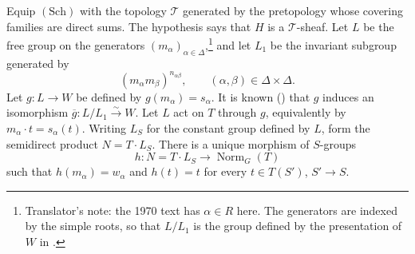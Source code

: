 

\SGAProof
Equip \((\mathrm{Sch})\) with the topology \(\mathcal T\) generated
by the pretopology whose covering families are direct sums. The
hypothesis says that \(H\) is a \(\mathcal T\)-sheaf. Let \(L\) be
the free group on the generators \((m_\alpha)_{\alpha\in\Delta}\),\footnote{Translator's note: the 1970 text has
\(\alpha\in R\) here. The generators are indexed by the simple roots, so that
\(L/L_1\) is the group defined by the presentation of \(W\) in
.} and
let \(L_1\) be the invariant subgroup generated by
\[
  (m_\alpha m_\beta)^{n_{\alpha\beta}},
  \qquad(\alpha,\beta)\in\Delta\times\Delta.
\]
Let \(g:L\to W\) be defined by \(g(m_\alpha)=s_\alpha\). It is known
() that \(g\) induces an isomorphism
\(\overline g:L/L_1\xrightarrow{\sim}W\). Let \(L\) act on \(T\)
through \(g\), equivalently by \(m_\alpha\cdot t=s_\alpha(t)\).
Writing \(L_S\) for the constant group defined by \(L\), form the
semidirect product \(N=T\cdot L_S\). There is a unique morphism of
\(S\)-groups
\[
  h:N=T\cdot L_S\longrightarrow\operatorname{Norm}_G(T)
\]
such that \(h(m_\alpha)=w_\alpha\) and \(h(t)=t\) for every
\(t\in T(S')\), \(S'\to S\).

